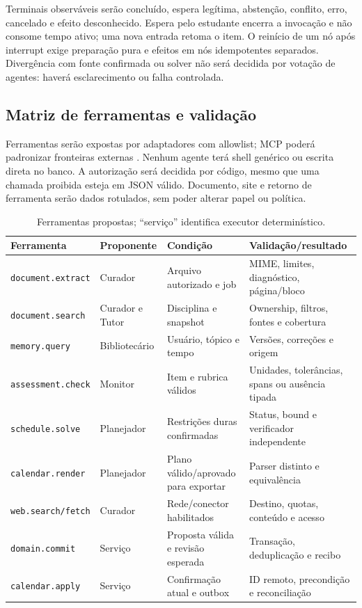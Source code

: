 \documentclass[12pt]{article}
\let\cite\citep
\newcommand{\code}[1]{\nolinkurl{#1}}
\begin{document}
Terminais observáveis serão concluído, espera legítima, abstenção, conflito, erro, cancelado e efeito desconhecido. Espera pelo estudante encerra a invocação e não consome tempo ativo; uma nova entrada retoma o item. O reinício de um nó após interrupt exige preparação pura e efeitos em nós idempotentes separados. Divergência com fonte confirmada ou solver não será decidida por votação de agentes: haverá esclarecimento ou falha controlada.

\subsection{Matriz de ferramentas e validação}

Ferramentas serão expostas por adaptadores com allowlist; MCP poderá padronizar fronteiras externas \cite{mcparch}. Nenhum agente terá shell genérico ou escrita direta no banco. A autorização será decidida por código, mesmo que uma chamada proibida esteja em JSON válido. Documento, site e retorno de ferramenta serão dados rotulados, sem poder alterar papel ou política.

\begin{table}[htbp]
\centering\small
\caption{Ferramentas propostas; ``serviço'' identifica executor determinístico.}
\begin{tabular}{@{}L{3.3cm}L{2.5cm}L{4.0cm}L{5.0cm}@{}}
\toprule
Ferramenta & Proponente & Condição & Validação/resultado \\
\midrule
\code{document.extract} & Curador & Arquivo autorizado e job & MIME, limites, diagnóstico, página/bloco \\
\code{document.search} & Curador e Tutor & Disciplina e snapshot & Ownership, filtros, fontes e cobertura \\
\code{memory.query} & Bibliotecário & Usuário, tópico e tempo & Versões, correções e origem \\
\code{assessment.check} & Monitor & Item e rubrica válidos & Unidades, tolerâncias, spans ou ausência tipada \\
\code{schedule.solve} & Planejador & Restrições duras confirmadas & Status, bound e verificador independente \\
\code{calendar.render} & Planejador & Plano válido/aprovado para exportar & Parser distinto e equivalência \\
\code{web.search/fetch} & Curador & Rede/conector habilitados & Destino, quotas, conteúdo e acesso \\
\code{domain.commit} & Serviço & Proposta válida e revisão esperada & Transação, deduplicação e recibo \\
\code{calendar.apply} & Serviço & Confirmação atual e outbox & ID remoto, precondição e reconciliação \\
\bottomrule
\end{tabular}
\label{tab:tools}
\end{table}
\end{document}

